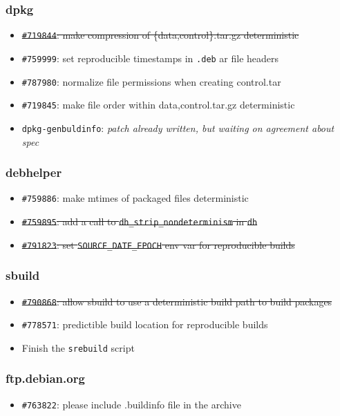 \documentclass[14pt]{beamer}
\begin{document}
\begin{frame}
 \frametitle{dpkg}

 \begin{itemize}\small
  \item \sout{\texttt{\#719844}: make compression of \{data,control\}.tar.gz deterministic}
  \item \texttt{\#759999}: set reproducible timestamps in \texttt{.deb} ar file headers
  \item \texttt{\#787980}: normalize file permissions when creating control.tar
  \item \texttt{\#719845}: make file order within {data,control}.tar.gz deterministic
  \item \texttt{dpkg-genbuldinfo}: \textit{patch already written, but waiting on agreement about spec}
 \end{itemize}
\end{frame}

\begin{frame}
 \frametitle{debhelper}

 \begin{itemize}\small
  \item \texttt{\#759886}: make mtimes of packaged files deterministic
  \item \sout{\texttt{\#759895}: add a call to
  \texttt{dh\_strip\_nondeterminism} in \texttt{dh}}
  \item \sout{\texttt{\#791823}: set \texttt{SOURCE\_DATE\_EPOCH} env var for
  reproducible builds}
 \end{itemize}
\end{frame}

\begin{frame}
 \frametitle{sbuild}

 \begin{itemize}\small
  \item \sout{\texttt{\#790868}: allow sbuild to use a deterministic build
  path to build packages}
  \item \texttt{\#778571}: predictible build location for reproducible builds
  \item Finish the \texttt{srebuild} script
 \end{itemize}
\end{frame}

\begin{frame}
 \frametitle{ftp.debian.org}

 \begin{itemize}\small
  \item \texttt{\#763822}: please include .buildinfo file in the archive
 \end{itemize}
\end{frame}
\end{document}
